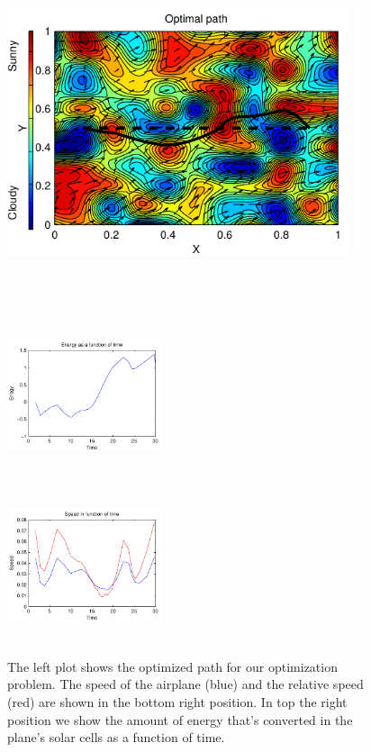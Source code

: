 \begin{figure}[width=15cm]
\begin{minipage}[c][11cm][t]{0.5\textwidth}
  \vspace*{\fill}
  \centering
  \includegraphics[width=10cm,height=10cm]{../src/plot/fancy2/path}
  \label{fig:test21}
\end{minipage}%
\begin{minipage}[c][11cm][t]{.5\textwidth}
  \vspace*{\fill}
  \centering
  \includegraphics[width=4.5cm,height=4.5cm]{../src/plot/fancy2/Energy}
  \label{fig:test22}\par\vfill
  \includegraphics[width=4.5cm,height=4.5cm]{../src/plot/fancy2/speed}
  \label{fig:test32}
\end{minipage}
\caption{The left plot shows the optimized path for our optimization problem. The speed of the airplane (blue) and the relative speed (red) are shown in the bottom right position. In top the right position we show the amount of energy that's converted in the plane's solar cells as a function of time.}
\label{fig:badPlot2}
\end{figure}


